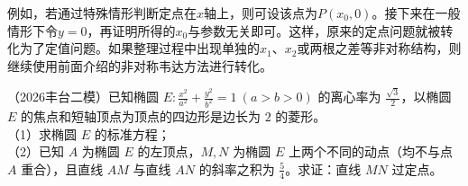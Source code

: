 例如，若通过特殊情形判断定点在$x$轴上，则可设该点为$P(x_0,0)$。接下来在一般情形下令$y=0$，再证明所得的$x_0$与参数无关即可。这样，原来的定点问题就被转化为了定值问题。如果整理过程中出现单独的$x_1$、$x_2$或两根之差等非对称结构，则继续使用前面介绍的非对称韦达方法进行转化。


\begin{example} %
（2026丰台二模）已知椭圆 $E:\frac{x^2}{a^2}+\frac{y^2}{b^2}=1\ (a>b>0)$ 的离心率为 $\frac{\sqrt{3}}{2}$，以椭圆 $E$ 的焦点和短轴顶点为顶点的四边形是边长为 $2$ 的菱形。\\
（1）求椭圆 $E$ 的标准方程；\\
（2）已知 $A$ 为椭圆 $E$ 的左顶点，$M,N$ 为椭圆 $E$ 上两个不同的动点（均不与点 $A$ 重合），且直线 $AM$ 与直线 $AN$ 的斜率之积为 $\frac{5}{4}$。求证：直线 $MN$ 过定点。
\end{example}

